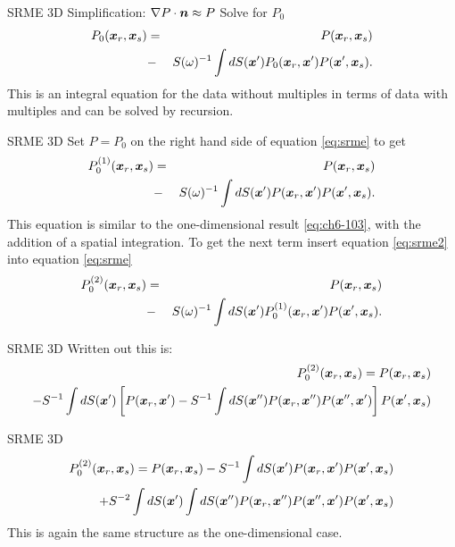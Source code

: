 \documentclass[xcolor=dvipsnames,notes]{beamer}
\begin{document}
\begin{frame}{SRME 3D}
Simplification: $\nabla P\cdot\mbox{\boldmath $n$} \approx P$
Solve for $P_0$
\begin{eqnarray}
P_0(\xx_r,\xx_s) & = & P(\xx_r,\xx_s) \nonumber\\
    & - & S(\omega)^{-1} \int dS(\xx') 
         P_0(\xx_r,\xx')P(\xx',\xx_s).  
                    \label{eq:srme}
\end{eqnarray}
This is an integral equation for the data without multiples in terms of
data with multiples and can be solved by recursion.
\end{frame}
\begin{frame}{SRME 3D}
Set $P=P_0$ on the right hand side of equation \eqref{eq:srme} to get
\begin{eqnarray}
P^{(1)}_0(\xx_r,\xx_s) & = & P(\xx_r,\xx_s)\nonumber \\
    & - & S(\omega)^{-1} \int dS(\xx') 
         P(\xx_r,\xx')P(\xx',\xx_s).  
                    \label{eq:srme2}
\end{eqnarray}
This equation is similar to the one-dimensional result 
\eqref{eq:ch6-103}, with the addition of a spatial integration.
To get the next term insert equation \eqref{eq:srme2} into equation \eqref{eq:srme}
\begin{eqnarray}
P^{(2)}_0(\xx_r,\xx_s) & = & P(\xx_r,\xx_s) \nonumber\\
    & - & S(\omega)^{-1} \int dS(\xx') 
         P^{(1)}_0(\xx_r,\xx')P(\xx',\xx_s).  
                    \label{eq:srme4}
\end{eqnarray}

\end{frame}
\begin{frame}{SRME 3D}
Written out this is:
\begin{eqnarray}
P^{(2)}_0(\xx_r,\xx_s)  =  P(\xx_r,\xx_s)\nonumber \\
   -  S^{-1} \int dS(\xx')
  \left[P(\xx_r,\xx') - S^{-1}\int dS(\xx'')P(\xx_r,\xx'')P(\xx'',\xx')\right]P(\xx',\xx_s)
          \label{eq:srme3}
\end{eqnarray}        
\end{frame}
\begin{frame}{SRME 3D}
\begin{eqnarray}
P^{(2)}_0(\xx_r,\xx_s)  =  P(\xx_r,\xx_s)
   -  S^{-1} \int dS(\xx')P(\xx_r,\xx') P(\xx',\xx_s)\\
+ S^{-2}\int dS(\xx')\int dS(\xx'')P(\xx_r,\xx'')P(\xx'',\xx')P(\xx',\xx_s)
          \label{eq:srme4}
\end{eqnarray}        
This is again the same structure as the one-dimensional case.
\end{frame}
\end{document}
